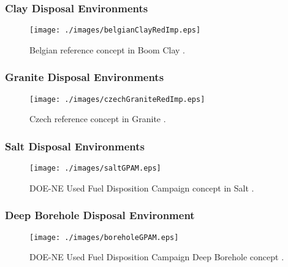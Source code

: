 

\begin{frame}[ctb!]
  \frametitle{Clay Disposal Environments}

  \begin{figure}[h!]
    \begin{center}
      \texttt{[image: ./images/belgianClayRedImp.eps]}
    \end{center}
    \caption{Belgian reference concept in Boom Clay 
    \cite{von_lensa_red-impact_2008}.}
    \label{fig:belgianClayRedImp}
  \end{figure}

\end{frame}

\begin{frame}[ctb!]
  \frametitle{Granite Disposal Environments}

  \begin{figure}[h!]
    \begin{center}
      \texttt{[image: ./images/czechGraniteRedImp.eps]}
    \end{center}
    \caption{Czech reference concept in Granite 
    \cite{von_lensa_red-impact_2008}.}
    \label{fig:czechGraniteRedImp}
  \end{figure}

\end{frame}

\begin{frame}[ctb!]
  \frametitle{Salt Disposal Environments}

  \begin{figure}[h!]
    \begin{center}
      \texttt{[image: ./images/saltGPAM.eps]}
    \end{center}
    \caption{DOE-NE Used Fuel Disposition Campaign  concept in 
    Salt \cite{clayton_generic_2011}.}
    \label{fig:saltGPAM}
  \end{figure}

\end{frame}

\begin{frame}[ctb!]
  \frametitle{Deep Borehole Disposal Environment}

  \begin{figure}[h!]
    \begin{center}
      \texttt{[image: ./images/boreholeGPAM.eps]}
    \end{center}
    \caption{DOE-NE Used Fuel Disposition Campaign Deep Borehole concept 
    \cite{clayton_generic_2011}.}
    \label{fig:boreholeGPAM}
  \end{figure}

\end{frame}


